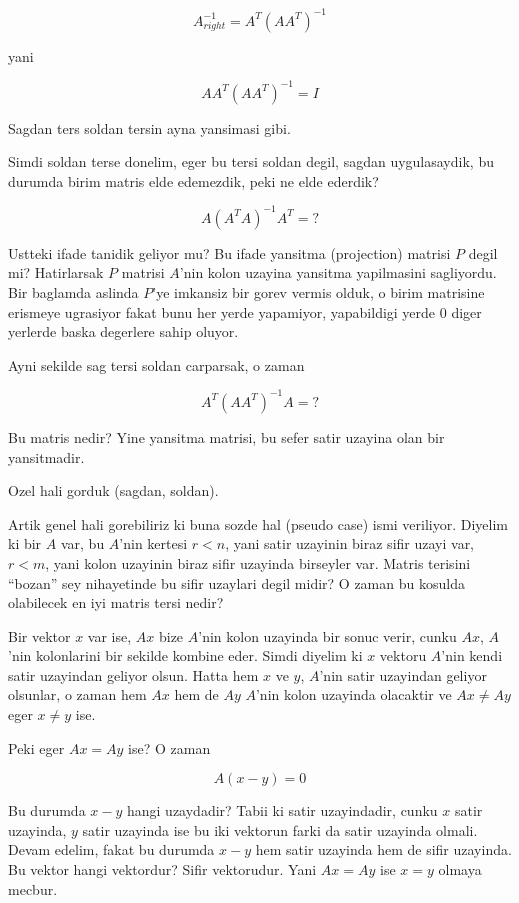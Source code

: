\documentclass[12pt,fleqn]{article}\usepackage{../common}
\begin{document}
$$ A_{right}^{-1} = A^T(AA^T)^{-1} $$

yani 

$$ A A^T(AA^T)^{-1} = I$$

Sagdan ters soldan tersin ayna yansimasi gibi. 

Simdi soldan terse donelim, eger bu tersi soldan degil, sagdan
uygulasaydik, bu durumda birim matris elde edemezdik, peki ne elde ederdik?


$$ A (A^TA)^{-1} A^T = ?$$

Ustteki ifade tanidik geliyor mu? Bu ifade yansitma (projection) matrisi
$P$ degil mi? Hatirlarsak $P$ matrisi $A$'nin kolon uzayina yansitma
yapilmasini sagliyordu. Bir baglamda aslinda $P$'ye imkansiz bir gorev
vermis olduk, o birim matrisine erismeye ugrasiyor fakat bunu her yerde
yapamiyor, yapabildigi yerde 0 diger yerlerde baska degerlere sahip
oluyor. 

Ayni sekilde sag tersi soldan carparsak, o zaman 

$$ A^T (AA^T)^{-1}A = ?$$

Bu matris nedir? Yine yansitma matrisi, bu sefer satir uzayina olan bir
yansitmadir. 

Ozel hali gorduk (sagdan, soldan). 

Artik genel hali gorebiliriz ki buna sozde hal (pseudo case) ismi
veriliyor. Diyelim ki bir $A$ var, bu $A$'nin kertesi $r < n$, yani satir
uzayinin biraz sifir uzayi var, $r < m$, yani kolon uzayinin biraz sifir
uzayinda birseyler var. Matris terisini ``bozan'' sey nihayetinde bu sifir
uzaylari degil midir? O zaman bu kosulda olabilecek en iyi matris tersi
nedir?

Bir vektor $x$ var ise, $Ax$ bize $A$'nin kolon uzayinda bir sonuc verir,
cunku $Ax$, $A$'nin kolonlarini bir sekilde kombine eder. Simdi diyelim ki
$x$ vektoru $A$'nin kendi satir uzayindan geliyor olsun. Hatta hem $x$ ve
$y$, $A$'nin satir uzayindan geliyor olsunlar, o zaman hem $Ax$ hem de $Ay$
$A$'nin kolon uzayinda olacaktir ve $Ax \ne Ay$ eger $x \ne y$ ise. 

Peki eger $Ax = Ay$ ise? O zaman 

$$ A(x-y) = 0 $$

Bu durumda $x-y$ hangi uzaydadir? Tabii ki satir uzayindadir, cunku $x$
satir uzayinda, $y$ satir uzayinda ise bu iki vektorun farki da satir
uzayinda olmali. Devam edelim, fakat bu durumda $x-y$ hem satir uzayinda
hem de sifir uzayinda. Bu vektor hangi vektordur? Sifir vektorudur. Yani
$Ax = Ay$ ise $x = y$ olmaya mecbur.
\end{document}
